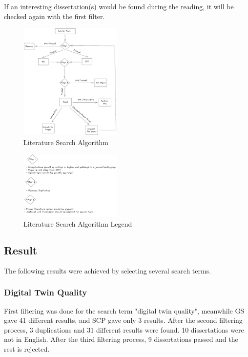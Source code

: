\documentclass[9pt,conference]{IEEEtran}
\begin{document}
    If an interesting dissertation(s) would be found during the reading, it will be checked again with the first filter.
    \begin{figure}
        \centering
        \includegraphics[width =0.45\textwidth]{LRMethod.png}
        \caption{Literature Search Algorithm}
        \label{fig:literaturesearchalgorithm}
    \end{figure} 
    \begin{figure}
        \centering
        \includegraphics[width =0.45\textwidth]{LRMethodLegacy.png}
        \caption{Literature Search Algorithm Legend}
        \label{fig:literaturesearchalgorithmlegend}
    \end{figure}
    
    \subsection{Result}
    \label{section:liteature_result}
    The following results were achieved by selecting several search terms.
    
    \subsubsection*{Digital Twin Quality}
    \label{subsection:DigitalTwinQuality}
    First filtering was done for the search term "digital twin quality", meanwhile GS gave 41 different results, and SCP gave only 3 results.
    After the second filtering process, 3 duplications and 31 different results were found. 10 dissertations were not in English.
    After the third filtering process, 9 dissertations passed and the rest is rejected.
\end{document}
